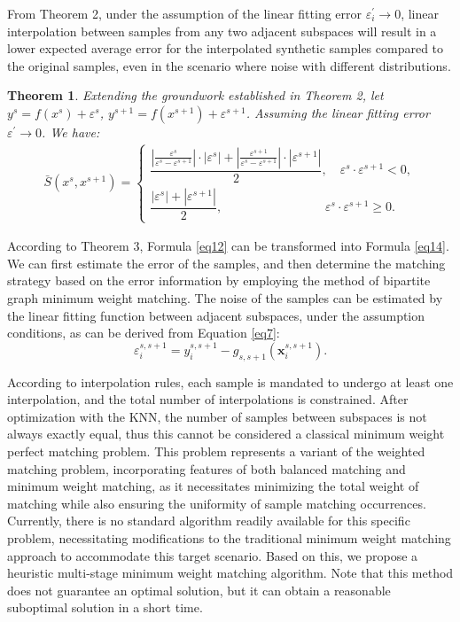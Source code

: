 \documentclass[final,3p,times]{elsarticle}
\newtheorem{theorem}{Theorem}
\begin{document}
From Theorem 2, under the assumption of the linear fitting error 
$\varepsilon_i^\prime\rightarrow0$, linear interpolation between 
samples from any two adjacent subspaces will result in a lower expected 
average error for the interpolated synthetic samples compared to 
the {original}   samples, even in the scenario where noise with different 
distributions. 

\begin{theorem}
\label{the3}
Extending the groundwork established in Theorem 2, let 
$y^s=f(x^s)+\varepsilon^s$, $y^{s+1}=f(x^{s+1})+\varepsilon^{s+1}$.
 Assuming the linear fitting error $\varepsilon^\prime
 \rightarrow0$. We have: 
\begin{equation}
\label{eq14}
\begin{aligned}
\bar{S}(x^s,x^{s+1})
=
\begin{cases} 
\dfrac{|\frac{\varepsilon^s}{\varepsilon^s-\varepsilon^{s+1}}|
\cdot |\varepsilon^{s}|+|\frac{\varepsilon^{s+1}}{\varepsilon^s-
\varepsilon^{s+1}}|\cdot|\varepsilon^{s+1}|}{2},\quad\varepsilon^s
\cdot \varepsilon^{s+1}<0,
\\
\dfrac{|\varepsilon^s|+|\varepsilon^{s+1}|}{2}, 
\;\qquad\qquad\qquad\qquad\varepsilon^s\cdot 
\varepsilon^{s+1}\ge0.
\end{cases}
\end{aligned}
\end{equation}
\end{theorem}


According to Theorem 3, Formula \eqref{eq12} can be transformed into 
Formula \eqref{eq14}. We can first estimate the error of the samples, 
and then determine the matching strategy based on the error 
information by employing the method of bipartite graph minimum 
weight matching. The noise of the samples can be estimated by the 
linear fitting function between adjacent subspaces, under the 
assumption conditions, as can be derived from Equation \eqref{eq7}:
\begin{equation} 
\label{eq15}
\varepsilon_i^{s,s+1}=y_i^{s,s+1}-g_{s,s+1}(\boldsymbol{x}_i^
{s,s+1}).
\end{equation} 

According to interpolation rules, each sample is mandated to 
undergo at least one interpolation, and the total number of 
interpolations is constrained. After optimization with the KNN, 
the number of samples between subspaces is not always exactly 
equal, thus this cannot be considered a classical minimum weight perfect 
matching problem. This problem represents a variant of the 
weighted matching problem, incorporating features of both 
balanced matching and minimum weight matching, as it necessitates 
minimizing the total weight of matching while also ensuring the 
uniformity of sample matching occurrences. Currently, there is 
no standard algorithm readily available for this specific 
problem, necessitating modifications to the traditional minimum 
weight matching approach to accommodate this target scenario. 
Based on this, we propose a heuristic multi-stage minimum weight 
matching algorithm. Note that this method does not guarantee an 
optimal solution, but it can obtain a reasonable suboptimal 
solution in a short time.
\end{document}
